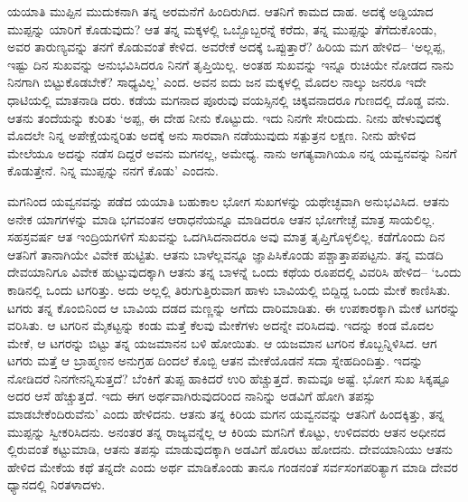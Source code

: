 ಯಯಾತಿ ಮುಪ್ಪಿನ ಮುದುಕನಾಗಿ ತನ್ನ ಅರಮನೆಗೆ ಹಿಂದಿರುಗಿದ. ಆತನಿಗೆ ಕಾಮದ ದಾಹ. ಅದಕ್ಕೆ ಅಡ್ಡಿಯಾದ ಮುಪ್ಪನ್ನು ಯಾರಿಗೆ ಕೊಡುವುದು? ಆತ ತನ್ನ ಮಕ್ಕಳಲ್ಲಿ ಒಬ್ಬೊಬ್ಬರನ್ನೆ ಕರೆದು, ತನ್ನ ಮುಪ್ಪನ್ನು ತೆಗೆದುಕೊಂಡು, ಅವರ ತಾರುಣ್ಯವನ್ನು ತನಗೆ ಕೊಡುವಂತೆ ಕೇಳಿದ. ಅವರೇಕೆ ಅದಕ್ಕೆ ಒಪ್ಪುತ್ತಾರೆ? ಹಿರಿಯ ಮಗ ಹೇಳಿದ– ‘ಅಲ್ಲಪ್ಪ, ಇಷ್ಟು ದಿನ ಸುಖವನ್ನು ಅನುಭವಿಸಿದರೂ ನಿನಗೆ ತೃಪ್ತಿಯಿಲ್ಲ. ಅಂತಹ ಸುಖವನ್ನು ಇನ್ನೂ ರುಚಿಯೇ ನೋಡದ ನಾನು ನಿನಗಾಗಿ ಬಿಟ್ಟುಕೊಡಬೇಕೆ? ಸಾಧ್ಯವಿಲ್ಲ’ ಎಂದ. ಅವನ ಐದು ಜನ ಮಕ್ಕಳಲ್ಲಿ ಮೊದಲ ನಾಲ್ಕು ಜನರೂ ಇದೇ ಧಾಟಿಯಲ್ಲಿ ಮಾತನಾಡಿ ದರು. ಕಡೆಯ ಮಗನಾದ ಪೂರುವು ವಯಸ್ಸಿನಲ್ಲಿ ಚಿಕ್ಕವನಾದರೂ ಗುಣದಲ್ಲಿ ದೊಡ್ಡ ವನು. ಆತನು ತಂದೆಯನ್ನು ಕುರಿತು ‘ಅಪ್ಪ, ಈ ದೇಹ ನೀನು ಕೊಟ್ಟುದು. ಇದು ನಿನಗೇ ಸೇರಿದುದು. ನೀನು ಹೇಳುವುದಕ್ಕೆ ಮೊದಲೇ ನಿನ್ನ ಅಪೇಕ್ಷೆಯನ್ನರಿತು ಅದಕ್ಕೆ ಅನು ಸಾರವಾಗಿ ನಡೆಯುವುದು ಸತ್ಪುತ್ರನ ಲಕ್ಷಣ. ನೀನು ಹೇಳಿದ ಮೇಲೆಯೂ ಅದನ್ನು ನಡೆಸ ದಿದ್ದರೆ ಅವನು ಮಗನಲ್ಲ, ಅಮೇಧ್ಯ. ನಾನು ಅಗತ್ಯವಾಗಿಯೂ ನನ್ನ ಯವ್ವನವನ್ನು ನಿನಗೆ ಕೊಡುತ್ತೇನೆ. ನಿನ್ನ ಮುಪ್ಪನ್ನು ನನಗೆ ಕೊಡು’ ಎಂದನು.

ಮಗನಿಂದ ಯವ್ವನವನ್ನು ಪಡೆದ ಯಯಾತಿ ಬಹುಕಾಲ ಭೋಗ ಸುಖಗಳನ್ನು ಯಥೇಚ್ಛವಾಗಿ ಅನುಭವಿಸಿದ. ಆತನು ಅನೇಕ ಯಾಗಗಳನ್ನು ಮಾಡಿ ಭಗವಂತನ ಆರಾಧನೆಯನ್ನೂ ಮಾಡಿದರೂ ಆತನ ಭೋಗೇಚ್ಛೆ ಮಾತ್ರ ಸಾಯಲಿಲ್ಲ. ಸಹಸ್ರವರ್ಷ ಆತ ಇಂದ್ರಿಯಗಳಿಗೆ ಸುಖವನ್ನು ಒದಗಿಸಿದನಾದರೂ ಅವು ಮಾತ್ರ ತೃಪ್ತಿಗೊಳ್ಳಲಿಲ್ಲ. ಕಡೆಗೊಂದು ದಿನ ಆತನಿಗೆ ತಾನಾಗಿಯೇ ವಿವೇಕ ಹುಟ್ಟಿತು. ಆತನು ಬಾಳೆಲ್ಲವನ್ನೂ ಜ್ಞಾಪಿಸಿಕೊಂಡು ಪಶ್ಚಾತ್ತಾಪಪಟ್ಟನು. ತನ್ನ ಮಡದಿ ದೇವಯಾನಿಗೂ ವಿವೇಕ ಹುಟ್ಟುವುದಕ್ಕಾಗಿ ಆತನು ತನ್ನ ಬಾಳನ್ನೆ ಒಂದು ಕಥೆಯ ರೂಪದಲ್ಲಿ ವಿವರಿಸಿ ಹೇಳಿದ– ‘ಒಂದು ಕಾಡಿನಲ್ಲಿ ಒಂದು ಟಗರಿತ್ತು. ಅದು ಅಲ್ಲಲ್ಲಿ ತಿರುಗುತ್ತಿರುವಾಗ ಹಾಳು ಬಾವಿಯಲ್ಲಿ ಬಿದ್ದಿದ್ದ ಒಂದು ಮೇಕೆ ಕಾಣಿಸಿತು. ಟಗರು ತನ್ನ ಕೊಂಬಿನಿಂದ ಆ ಬಾವಿಯ ದಡದ ಮಣ್ಣನ್ನು ಅಗೆದು ದಾರಿಮಾಡಿತು. ಈ ಉಪಕಾರಕ್ಕಾಗಿ ಮೇಕೆ ಟಗರನ್ನು ವರಿಸಿತು. ಆ ಟಗರಿನ ಮೈಕಟ್ಟನ್ನು ಕಂಡು ಮತ್ತೆ ಕೆಲವು ಮೇಕೆಗಳು ಅದನ್ನೇ ವರಿಸಿದವು. ಇದನ್ನು ಕಂಡ ಮೊದಲ ಮೇಕೆ, ಆ ಟಗರನ್ನು ಬಿಟ್ಟು ತನ್ನ ಯಜಮಾನನ ಬಳಿ ಹೋಯಿತು. ಆ ಯಜಮಾನ ಟಗರಿನ ಕೊಬ್ಬನ್ನಿಳಿಸಿದ. ಆಗ ಟಗರು ಮತ್ತೆ ಆ ಬ್ರಾಹ್ಮಣನ ಅನುಗ್ರಹ ದಿಂದಲೆ ಕೊಬ್ಬಿ ಆತನ ಮೇಕೆಯೊಡನೆ ಸದಾ ಸ್ನೇಹದಿಂದಿತ್ತು. ಇದನ್ನು ನೋಡಿದರೆ ನಿನಗೇನನ್ನಿಸುತ್ತದೆ? ಬೆಂಕಿಗೆ ತುಪ್ಪ ಹಾಕಿದರೆ ಉರಿ ಹೆಚ್ಚುತ್ತದೆ. ಕಾಮವೂ ಅಷ್ಟೆ. ಭೋಗ ಸುಖ ಸಿಕ್ಕಷ್ಟೂ ಅದರ ಆಸೆ ಹೆಚ್ಚುತ್ತದೆ. ಇದು ಈಗ ಅರ್ಥವಾಗಿರುವುದರಿಂದ ನಾನಿನ್ನು ಅಡವಿಗೆ ಹೋಗಿ ತಪಸ್ಸು ಮಾಡಬೇಕೆಂದಿರುವೆನು’ ಎಂದು ಹೇಳಿದನು. ಆತನು ತನ್ನ ಕಿರಿಯ ಮಗನ ಯವ್ವನವನ್ನು ಆತನಿಗೆ ಹಿಂದಕ್ಕಿತ್ತು, ತನ್ನ ಮುಪ್ಪನ್ನು ಸ್ವೀಕರಿಸಿದನು. ಅನಂತರ ತನ್ನ ರಾಜ್ಯವನ್ನೆಲ್ಲ ಆ ಕಿರಿಯ ಮಗನಿಗೆ ಕೊಟ್ಟು, ಉಳಿದವರು ಆತನ ಅಧೀನದ ಲ್ಲಿರುವಂತೆ ಕಟ್ಟುಮಾಡಿ, ಆತನು ತಪಸ್ಸು ಮಾಡುವುದಕ್ಕಾಗಿ ಅಡವಿಗೆ ಹೊರಟು ಹೋದನು. ದೇವಯಾನಿಯು ಆತನು ಹೇಳಿದ ಮೇಕೆಯ ಕಥೆ ತನ್ನದೇ ಎಂದು ಅರ್ಥ ಮಾಡಿಕೊಂಡು ತಾನೂ ಗಂಡನಂತೆ ಸರ್ವಸಂಗಪರಿತ್ಯಾಗ ಮಾಡಿ ದೇವರ ಧ್ಯಾನದಲ್ಲಿ ನಿರತಳಾದಳು.

